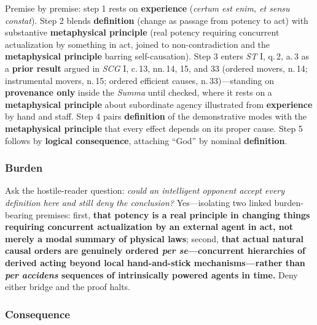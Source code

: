 Premise by premise: step 1 rests on \textbf{experience} (\emph{certum est enim, et sensu constat}). Step 2 blends \textbf{definition} (change as passage from potency to act) with substantive \textbf{metaphysical principle} (real potency requiring concurrent actualization by something in act, joined to non-contradiction and the \textbf{metaphysical principle} barring self-causation). Step 3 enters \emph{ST} I, q.\,2, a.\,3 as a \textbf{prior result} argued in \emph{SCG} I, c.\,13, nn.\,14, 15, and 33 (ordered movers, n.\,14; instrumental movers, n.\,15; ordered efficient causes, n.\,33)---standing on \textbf{provenance only} inside the \emph{Summa} until checked, where it rests on a \textbf{metaphysical principle} about subordinate agency illustrated from \textbf{experience} by hand and staff. Step 4 pairs \textbf{definition} of the demonstrative modes with the \textbf{metaphysical principle} that every effect depends on its proper cause. Step 5 follows by \textbf{logical consequence}, attaching ``God'' by nominal \textbf{definition}.

\subsubsection*{Burden}

Ask the hostile-reader question: \emph{could an intelligent opponent accept every definition here and still deny the conclusion?} Yes---isolating two linked burden-bearing premises: first, \textbf{that potency is a real principle in changing things requiring concurrent actualization by an external agent in act, not merely a modal summary of physical laws}; second, \textbf{that actual natural causal orders are genuinely ordered \emph{per se}---concurrent hierarchies of derived acting beyond local hand-and-stick mechanisms---rather than \emph{per accidens} sequences of intrinsically powered agents in time.} Deny either bridge and the proof halts.

\subsubsection*{Consequence}

